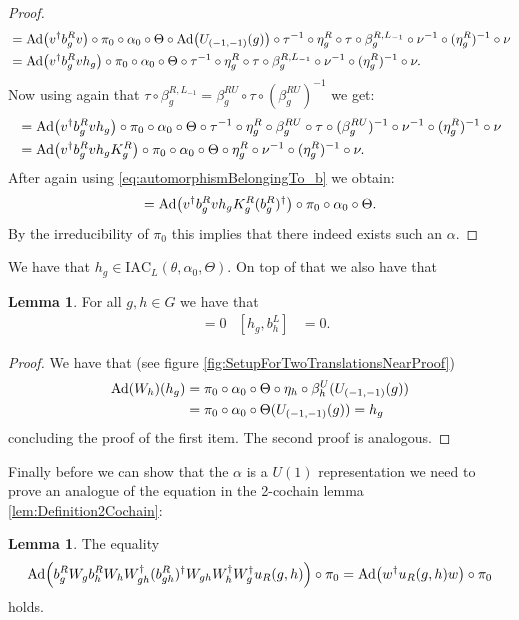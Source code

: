 \documentclass[12pt,a4paper,twoside]{article}
\newcommand{\IAC}{\textrm{IAC}}
\let\originalleft\left
\let\originalright\right
\renewcommand{\left}{\mathopen{}\mathclose\bgroup\originalleft}
\renewcommand{\right}{\aftergroup\egroup\originalright}
\newcommand{\Ad}[1]{\textrm{Ad}\left(#1\right)}
\theoremstyle{definition}
\newtheorem{lemma}[theorem]{Lemma}
\numberwithin{equation}{section}
\begin{document}
\begin{proof}
	\begin{align}
		&=\Ad{v^\dagger b_g^R v}\circ\pi_0\circ\alpha_0\circ\Theta\circ\Ad{U_{(-1,-1)}(g)}\circ\tau^{-1}\circ\eta_g^R\circ\tau\circ\beta_g^{R,L_{-1}}\circ\nu^{-1}\circ(\eta_g^R)^{-1}\circ\nu\\
		&=\Ad{v^\dagger b_g^R vh_g}\circ\pi_0\circ\alpha_0\circ\Theta\circ\tau^{-1}\circ\eta_g^R\circ\tau\circ\beta_g^{R,L_{-1}}\circ\nu^{-1}\circ(\eta_g^R)^{-1}\circ\nu.
	\end{align}
	Now using again that $\tau\circ\beta_g^{R,L_{-1}}=\beta_{g}^{RU}\circ\tau\circ(\beta_g^{RU})^{-1}$ we get:
	\begin{align}
		&=\Ad{v^\dagger b_g^R vh_g}\circ\pi_0\circ\alpha_0\circ\Theta\circ\tau^{-1}\circ\eta_g^R\circ\beta_{g}^{RU}\circ\tau\circ(\beta_g^{RU})^{-1}\circ\nu^{-1}\circ(\eta_g^R)^{-1}\circ\nu\\
		&=\Ad{v^\dagger b_g^R vh_gK_g^R}\circ\pi_0\circ\alpha_0\circ\Theta\circ\eta_g^R\circ\nu^{-1}\circ(\eta_g^R)^{-1}\circ\nu.
	\end{align}
	After again using \eqref{eq:automorphismBelongingTo_b} we obtain:
	\begin{align}
		=\Ad{v^\dagger b_g^R vh_gK_g^R(b_g^R)^\dagger}\circ\pi_0\circ\alpha_0\circ\Theta.
	\end{align}
	By the irreducibility of $\pi_0$ this implies that there indeed exists such an $\alpha$.
\end{proof}
We have that $h_g\in\IAC_L(\theta,\alpha_0,\Theta)$. On top of that we also have that
\begin{lemma}\label{lem:W_g_And_h_g_Commute}
	For all $g,h\in G$ we have that
	\begin{align}
		[h_g,W_h]&=0&[h_g,b_h^L]&=0.
	\end{align}
\end{lemma}
\begin{proof}
	We have that (see figure \ref{fig:SetupForTwoTranslationsNearProof})
	\begin{align}
		\Ad{W_h}(h_g)&=\pi_0\circ\alpha_0\circ\Theta\circ\eta_h\circ\beta_h^U(U_{(-1,-1)}(g))\\
		&=\pi_0\circ\alpha_0\circ\Theta(U_{(-1,-1)}(g))=h_g
	\end{align}
	concluding the proof of the first item. The second proof is analogous.
\end{proof}
Finally before we can show that the $\alpha$ is a $U(1)$ representation we need to prove an analogue of the equation in the 2-cochain lemma \ref{lem:Definition2Cochain}:
\begin{lemma}\label{lem:translating_u_R_To_The_Right_identity}
The equality
\begin{equation}
\Ad{b_g^R W_g b_h^R W_h W_{gh}^\dagger (b_{gh}^R)^\dagger W_{gh}W_h^\dagger W_g^\dagger u_R(g,h)}\circ\pi_0=\Ad{w^\dagger u_R(g,h) w}\circ\pi_0
\end{equation}
holds.
\end{lemma}
\end{document}

